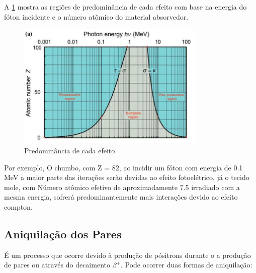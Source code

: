 \documentclass[11pt,a4paper]{article}
\newcounter{exemplo}
\begin{document}
            A \ref{fig:predominanciaInteracoes} mostra as regiões de predominância de cada efeito com base na energia do fóton incidente e o número atômico do material absorvedor.    

            \begin{figure}[h]
                \centering
                \includegraphics[width=0.8\textwidth]{Imagens/predominanciaInteracoes.JPG}
                \caption{Predominância de cada efeito}
                \label{fig:predominanciaInteracoes}
            \end{figure}

            Por exemplo, O chumbo, com Z = 82, ao incidir um fóton com energia de 0.1 MeV a maior parte das iterações serão devidas ao efeito fotoelétrico, já o tecido mole, com Número atômico efetivo de aproximadamente 7.5 irradiado com a mesma energia, sofrerá predominantemente mais interações devido ao efeito compton.

        

        \subsection{Aniquilação dos Pares}

            É um processo que ocorre devido à produção de pósitrons durante o a produção de pares ou através do decaimento $\beta^+$. Pode ocorrer duas formas de aniquilação:
\end{document}
